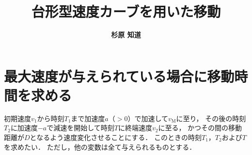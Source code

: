 ﻿\documentclass[a4paper]{jsarticle}
\title{\bf 台形型速度カーブを用いた移動}
\author{\Large{\bf 杉原 知道}}
\date{}
\begin{document}
\maketitle
\vspace{-\baselineskip}

\section{最大速度が与えられている場合に移動時間を求める}

\begin{figure}[th]
\begin{center}

\end{center}
\end{figure}

初期速度$v_{1}$から時刻$T_{1}$まで加速度$a$（$>0$）で加速して$v_{\mathrm{M}}$に至り，
その後の時刻$T_{2}$に加速度$-a$で減速を開始して時刻$T$に終端速度$v_{2}$に至る，
かつその間の移動距離が$D$となるよう速度変化させることにする．
このときの時刻$T_{1}$，$T_{2}$および$T$を求めたい．
ただし，他の変数は全て与えられるものとする．
\end{document}
